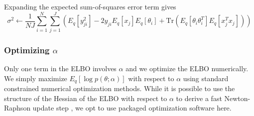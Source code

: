 \documentclass[11pt]{amsart}
\begin{document}
Expanding the expected sum-of-squares error term gives
\begin{equation}
	\sigma^2 \leftarrow  \frac{1}{NJ} \sum_{i=1}^N \sum_{j=1}^J  \left( E_q [ y_{ji}^2 ]  - 2 y_{ji} E_q [ x_j ] E_q[ \theta_i ] + \text{Tr} ( E_q [  \theta_i \theta_i^T ] E_q [ x_j^T x_j ] ) \right)
\end{equation}

\subsubsection{Optimizing $\alpha$} 
Only one term in the ELBO involves $\alpha$ and we optimize the ELBO numerically. We simply maximize $E_q \left[ \log p(\theta; \alpha) \right]$ with respect to $\alpha$ using standard constrained numerical optimization methods. While it is possible to use the structure of the Hessian of the ELBO with respect to $\alpha$ to derive a fast Newton-Raphson update step \cite{Blei}, we opt to use packaged optimization software here.




\end{document}

